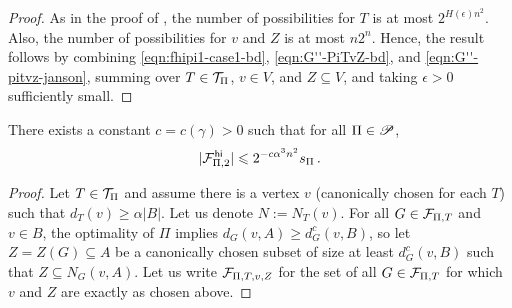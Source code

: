 \begin{proof}
As in the proof of , the number of possibilities for $T$ is at most $2^{H(\epsilon)n^2}$. Also, the number of possibilities for $v$ and $Z$ is at most $n2^n$. Hence, the result follows by combining \eqref{eqn:fhipi1-case1-bd}, \eqref{eqn:G''-PiTvZ-bd}, and \eqref{eqn:G''-pitvz-janson}, summing over $T\in{\mathcal T}_\Pi$, $v\in V$, and $Z\subseteq V$, and taking $\epsilon>0$ sufficiently small.
\end{proof}

\begin{lemma}\label{lemma:FPi2}
There exists a constant $c=c(\gamma)>0$ such that for all $\Pi\in{\mathscr P}$,
$$\lvert{\mathcal F}^{\hspace{0.2mm}\mathsf{hi}}_{\Pi,2}\rvert\leqslant2^{-c\alpha^3n^2}s_\Pi\,.$$
\end{lemma}
\begin{proof}
Let $T\in{\mathcal T}_\Pi$ and assume there is a vertex $v$ (canonically chosen for each $T$) such that $d_T(v)\geq\alpha|B|$. Let us denote $N:=N_T(v)$. For all $G\in{\mathcal F}_{\Pi,T}$ and $v\in B$, the optimality of $\Pi$ implies $d_G(v,A)\geq d_G^c(v,B)$, so let $Z=Z(G)\subseteq A$ be a canonically chosen subset of size at least $d_G^c(v,B)$ such that $Z\subseteq N_G(v,A)$. Let us write ${\mathcal F}_{\Pi,T,v,Z}$ for the set of all $G\in{\mathcal F}_{\Pi,T}$ for which $v$ and $Z$ are exactly as chosen above.


\end{proof}
